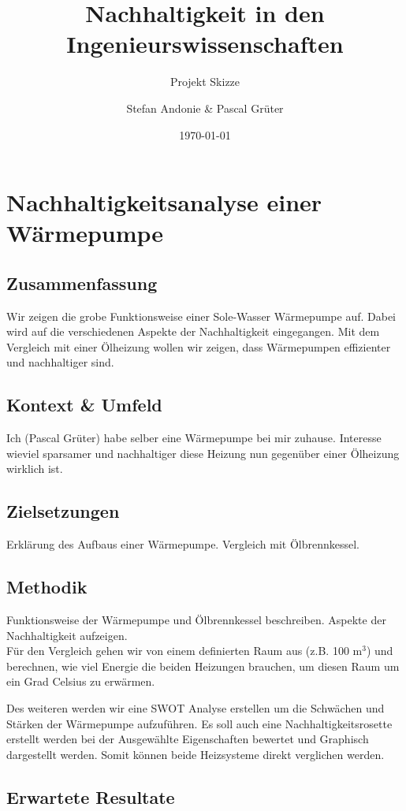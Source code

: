 \documentclass[09pt,paper=a4,final]{scrartcl}
\title{Nachhaltigkeit in den Ingenieurswissenschaften}
\subtitle{Projekt Skizze}
\author{Stefan Andonie \& Pascal Grüter}
\date{\today{}}
\begin{document}
\section*{Nachhaltigkeitsanalyse einer Wärmepumpe}

\subsection*{Zusammenfassung}

Wir zeigen die grobe Funktionsweise einer Sole-Wasser Wärmepumpe auf. Dabei wird auf die verschiedenen Aspekte der Nachhaltigkeit eingegangen. Mit dem Vergleich mit einer Ölheizung wollen wir zeigen, dass Wärmepumpen effizienter und nachhaltiger sind.

\subsection*{Kontext \& Umfeld}

Ich (Pascal Grüter) habe selber eine Wärmepumpe bei mir zuhause. Interesse wieviel sparsamer und nachhaltiger diese Heizung nun gegenüber einer Ölheizung wirklich ist.

\subsection*{Zielsetzungen}

Erklärung des Aufbaus einer Wärmepumpe.
Vergleich mit Ölbrennkessel.

\subsection*{Methodik}

Funktionsweise der Wärmepumpe und Ölbrennkessel beschreiben. Aspekte der Nachhaltigkeit aufzeigen. \\
Für den Vergleich gehen wir von einem definierten Raum aus (z.B. 100 m$^{3}$) und berechnen, wie viel Energie die beiden Heizungen brauchen, um diesen Raum um ein Grad Celsius zu erwärmen.

Des weiteren werden wir eine SWOT Analyse erstellen um die Schwächen und Stärken der Wärmepumpe aufzuführen.
Es soll auch eine Nachhaltigkeitsrosette erstellt werden bei der Ausgewählte
Eigenschaften bewertet und Graphisch dargestellt werden. Somit können beide Heizsysteme
direkt verglichen werden.


\subsection*{Erwartete Resultate}
\end{document}
